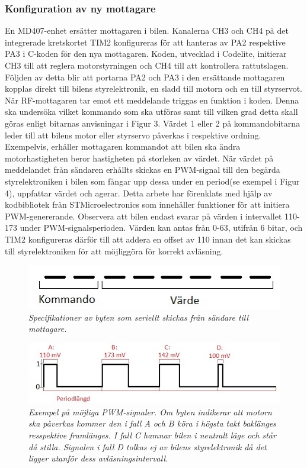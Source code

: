 \documentclass[a4paper]{article}
\begin{document}
\subsubsection{Konfiguration av ny mottagare}
\vspace{5mm} \noindent
En MD407-enhet ersätter mottagaren i bilen. Kanalerna CH3 och CH4 på det integrerade kretskortet TIM2 konfigureras för att hanteras av PA2 respektive PA3 i C-koden för den nya mottagaren. Koden, utvecklad i Codelite, initierar CH3 till att reglera motorstyrningen och CH4 till att kontrollera rattutslagen. Följden av detta blir att portarna PA2 och PA3 i den ersättande mottagaren kopplas direkt till bilens styrelektronik, en sladd till motorn och en till styrservot. När RF-mottagaren tar emot ett meddelande triggas en funktion i koden. Denna ska undersöka vilket kommando som ska utföras samt till vilken grad detta skall göras enligt bitarnas anvisningar i Figur 3. Värdet 1 eller 2 på kommandobitarna leder till att bilens motor eller styrservo påverkas i respektive ordning. Exempelvis, erhåller mottagaren kommandot att bilen ska ändra motorhastigheten beror hastigheten på storleken av värdet. När värdet på meddelandet från sändaren erhållts skickas en PWM-signal till den begärda styrelektroniken i bilen som fångar upp dessa under en period(se exempel i Figur 4), uppfattar värdet och agerar. Detta arbete har förenklats med hjälp av kodbibliotek från STMicroelectronics som innehåller funktioner för att initiera PWM-genererande. Observera att bilen endast svarar på värden i intervallet 110-173 under PWM-signalsperioden. Värden kan antas från 0-63, utifrån 6 bitar, och TIM2 konfigureras därför till att addera en offset av 110 innan det kan skickas till styrelektroniken för att möjliggöra för korrekt avläsning.



\begin{figure}[H]
\includegraphics[scale=1]{aByteComVal.jpg}
\centering
\caption{\it Specifikationer av byten som seriellt skickas från sändare till mottagare.}
\end{figure} 


\begin{figure}[H]
\includegraphics[scale=1]{PWMsignals.jpg}
\centering
\caption{\it Exempel på möjliga PWM-signaler. Om byten indikerar att motorn ska påverkas kommer den i fall A och B köra i högsta takt baklänges resspektive framlänges. I fall C hamnar bilen i neutralt läge och står då stilla. Signalen i fall D tolkas ej av bilens styrelektronik då det ligger utanför dess avläsningsintervall.}
\end{figure} 
\end{document}
